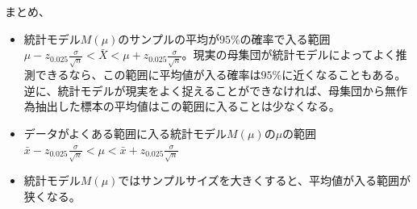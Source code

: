 まとめ、
\begin{framed}
    \begin{itemize}
        \item 統計モデル$M(\mu)$のサンプルの平均が$95\%$の確率で入る範囲$\mu - z_{0.025} \frac{\sigma}{\sqrt{n}} < \bar{X} < \mu + z_{0.025} \frac{\sigma}{\sqrt{n}}$。現実の母集団が統計モデルによってよく推測できるなら、この範囲に平均値が入る確率は$95\%$に近くなることもある。逆に、統計モデルが現実をよく捉えることができなければ、母集団から無作為抽出した標本の平均値はこの範囲に入ることは少なくなる。
        \item データがよくある範囲に入る統計モデル$M(\mu)$の$\mu$の範囲$\bar{x}- z_{0.025}\frac{\sigma}{\sqrt{n}} < \mu < \bar{x} + z_{0.025}\frac{\sigma}{\sqrt{n}}$
        \item  統計モデル$M(\mu)$ではサンプルサイズを大きくすると、平均値が入る範囲が狭くなる。
    \end{itemize}
\end{framed}